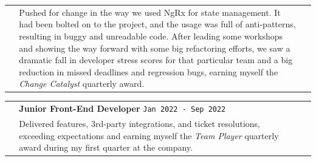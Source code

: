 \documentclass[letterpaper,11pt]{article}
\begin{document}
\vspace{-4pt}

\begin{tabular*}{6.6in}{p{0.2in}p{6.3in}p{0in}}

\, &
  
{\small
     
       Pushed for change in the way we used NgRx for state management. It had been bolted on to the project, and the usage was full of anti-patterns, resulting in buggy and unreadable code. After leading some workshops and showing the way forward with some big refactoring efforts, we saw a dramatic fall in developer stress scores for that particular team and a big reduction in missed deadlines and regression bugs, earning myself the \textit{Change Catalyst} quarterly award.

     } &
         \, \\

  \end{tabular*}

  
\begin{tabular*}{6.6in}{p{0.2in}p{6.3in}p{0in}}

  \, &
  { \textbf{\small Junior Front-End Developer}\cftdotfill{\cftdotsep} \texttt{\small Jan 2022 - Sep 2022}} &
   \, \\

  \, &
  {\small
     Delivered features, 3rd-party integrations, and ticket resolutions, exceeding expectations and earning myself the \textit{Team Player} quarterly award during my first quarter at the company. } &
   \, \\


\end{tabular*}
  
  





  
\end{document}
